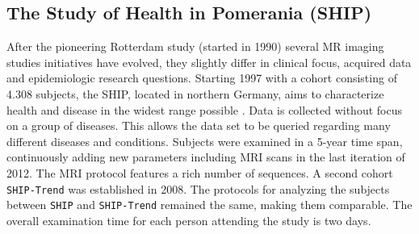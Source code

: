 \documentclass[journal]{style/vgtc} 			          %
\begin{document}


\subsection{The Study of Health in Pomerania (SHIP)}
After the pioneering Rotterdam study (started in 1990) several MR imaging studies initiatives have evolved, they slightly differ in clinical focus, acquired data and epidemiologic research questions.
%
Starting 1997 with a cohort consisting of 4.308 subjects, the SHIP, located in northern Germany, aims to characterize health and disease in the widest range possible \cite{Volzke2011}.
%
Data is collected without focus on a group of diseases.
%
This allows the data set to be queried regarding many different diseases and conditions.
%
Subjects were examined in a 5-year time span, continuously adding new parameters including MRI scans in the last iteration of 2012.
%
The MRI protocol features a rich number of sequences.
%
%
A second cohort \texttt{SHIP-Trend} was established in 2008.
%
The protocols for analyzing the subjects between \texttt{SHIP} and \texttt{SHIP-Trend} remained the same, making them comparable.
%
The overall examination time for each person attending the study is two days.
\end{document}
